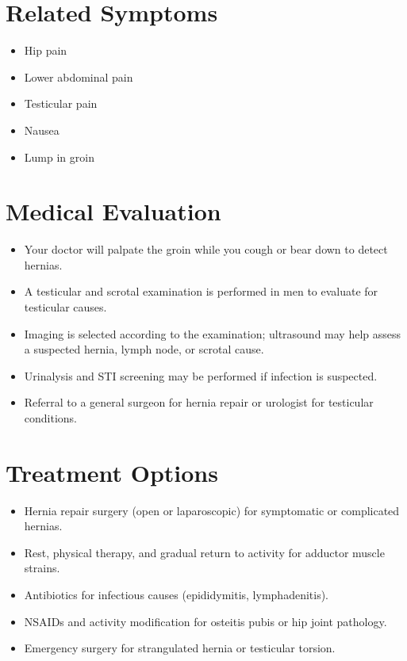 \section*{Related Symptoms}
\begin{itemize}
  \item Hip pain
  \item Lower abdominal pain
  \item Testicular pain
  \item Nausea
  \item Lump in groin
\end{itemize}

\section*{Medical Evaluation}
\begin{itemize}
  \item Your doctor will palpate the groin while you cough or bear down to detect hernias.
  \item A testicular and scrotal examination is performed in men to evaluate for testicular causes.
  \item Imaging is selected according to the examination; ultrasound may help assess a suspected hernia, lymph node, or scrotal cause.
  \item Urinalysis and STI screening may be performed if infection is suspected.
  \item Referral to a general surgeon for hernia repair or urologist for testicular conditions.
\end{itemize}

\section*{Treatment Options}
\begin{itemize}
  \item Hernia repair surgery (open or laparoscopic) for symptomatic or complicated hernias.
  \item Rest, physical therapy, and gradual return to activity for adductor muscle strains.
  \item Antibiotics for infectious causes (epididymitis, lymphadenitis).
  \item NSAIDs and activity modification for osteitis pubis or hip joint pathology.
  \item Emergency surgery for strangulated hernia or testicular torsion.
\end{itemize}

